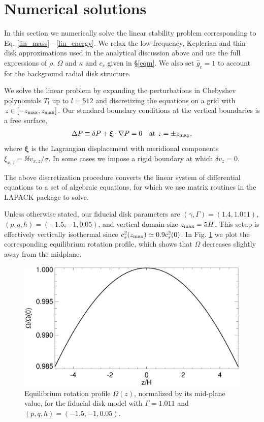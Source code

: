 \section{Numerical solutions}\label{numerical}
In this section we numerically solve the linear stability problem
corresponding to Eq. \ref{lin_mass}---\ref{lin_energy}. 
We relax the  low-frequency, Keplerian and thin-disk 
approximations used in the analytical discussion above and 
use the full expressions of $\rho$, $\Omega$ and 
$\kappa$ and $c_s$ given in \S\ref{eqm}. We also set $\hat{g}_c=1$ to   
account for the background radial disk structure.  

We solve the linear problem by expanding the 
perturbations in Chebyshev polynomials $T_l$ up to $l=512$
and discretizing the equations on a grid with
$z\in[-z_\mathrm{max},z_\mathrm{max}]$. Our standard boundary conditions at the vertical
boundaries is a free surface,  
\begin{align}
  \Delta P \equiv \delta P + \bm{\xi}\cdot\nabla P= 0 \quad \text{at } z=\pm z_\mathrm{max},
\end{align}
where $\bm{\xi}$ is the Lagrangian displacement with meridional 
components $\xi_{x,z} = \ii\delta v_{x,z}/\sigma$. In some cases we
impose a rigid boundary at which $\delta v_z=0$. 

The above discretization procedure
converts the linear system of differential equations to a set of 
algebraic equations, for which we use matrix routines in the LAPACK
package to solve. 

Unless otherwise stated, our fiducial disk parameters are 
$(\gamma, \Gamma) = (1.4, 1.011)$, $(p,q, h)=(-1.5,-1,0.05)$, and 
vertical domain size $z_\mathrm{max}=5H$. This setup is effectively vertically
isothermal since $c_s^2(z_\mathrm{max}) \simeq 0.9c_s^2(0)$. In Fig. \ref{omega_z}
we plot the corresponding equilibrium rotation profile, which shows
that $\Omega$ decreases slightly away from the midplane.   

\begin{figure}
  \includegraphics[width=\linewidth,clip=true,trim=0cm 0cm 0cm
  0cm]{figures/omega2} 
  \caption{Equilibrium rotation profile $\Omega(z)$,
    normalized by its mid-plane value, for  the fiducial disk model with $\Gamma=1.011$
    and $(p,q, h)=(-1.5,-1,0.05)$. 
    \label{omega_z} 
  }
\end{figure}

